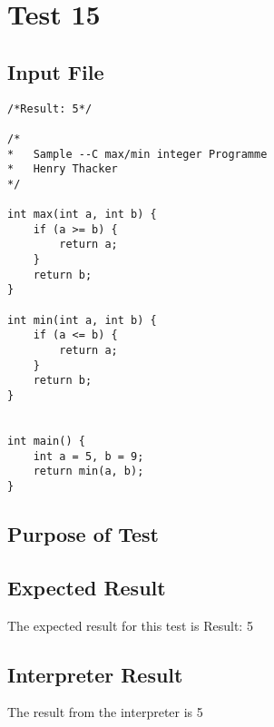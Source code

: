 \section{Test 15}
\subsection{Input File}
\begin{verbatim}
/*Result: 5*/

/*
*	Sample --C max/min integer Programme
*	Henry Thacker
*/

int max(int a, int b) {
	if (a >= b) {
		return a;
	}
	return b;
}

int min(int a, int b) {
	if (a <= b) {
		return a;
	}
	return b;
}


int main() {
	int a = 5, b = 9;
	return min(a, b);
}\end{verbatim}\subsection{Purpose of Test}

\subsection{Expected Result}
The expected result for this test is Result: 5
\subsection{Interpreter Result}
The result from the interpreter is 5
